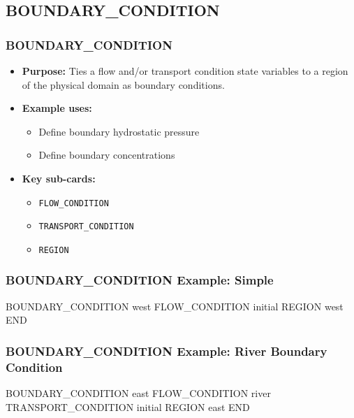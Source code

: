 \subsection{BOUNDARY\_CONDITION}

\begin{frame}\frametitle{BOUNDARY\_CONDITION}

\begin{itemize}
\item[] \textbf{Purpose:} Ties a flow and/or transport condition state variables to a region of the physical domain as boundary conditions.
\item[] \textbf{Example uses:}
\begin{itemize}
  \item Define boundary hydrostatic pressure
  \item Define boundary concentrations
\end{itemize}
\item[] \textbf{Key sub-cards:}
\begin{itemize}
  \item[] \verb|FLOW_CONDITION|
  \item[] \verb|TRANSPORT_CONDITION|
  \item[] \verb|REGION|
\end{itemize}
\end{itemize}

\end{frame}

\begin{frame}[fragile]\frametitle{BOUNDARY\_CONDITION Example: Simple}

\begin{semiverbatim}
BOUNDARY_CONDITION west
  FLOW_CONDITION initial
  REGION west
END
\end{semiverbatim}

\end{frame}

\begin{frame}[fragile]\frametitle{BOUNDARY\_CONDITION Example: River Boundary Condition}

\begin{semiverbatim}
BOUNDARY_CONDITION east
  FLOW_CONDITION river
  TRANSPORT_CONDITION initial
  REGION east
END
\end{semiverbatim}

\end{frame}
